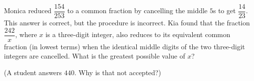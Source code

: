 Monica reduced $\dfrac{154}{253}$ to a common fraction by cancelling the middle $5$s to get $\dfrac{14}{23}$. This answer is correct, but the procedure is incorrect. Kia found that the fraction $\dfrac{242}{x}$, where $x$ is a three-digit integer, also reduces to its equivalent common fraction (in lowest terms) when the identical middle digits of the two three-digit integers are cancelled. What is the greatest possible value of $x$?

(A student answers $440$. Why is that not accepted?)
